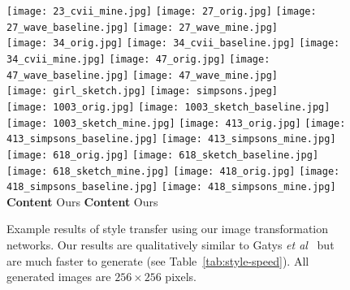 \documentclass[runningheads]{llncs}
\newcommand{\etal}{\textit{et al}}
\begin{document}
\begin{figure}
  \texttt{[image: 23\_cvii\_mine.jpg]}
  \texttt{[image: 27\_orig.jpg]}
  \texttt{[image: 27\_wave\_baseline.jpg]}
  \texttt{[image: 27\_wave\_mine.jpg]} \\
  \texttt{[image: 34\_orig.jpg]}
  \texttt{[image: 34\_cvii\_baseline.jpg]}
  \texttt{[image: 34\_cvii\_mine.jpg]}
  \texttt{[image: 47\_orig.jpg]}
  \texttt{[image: 47\_wave\_baseline.jpg]}
  \texttt{[image: 47\_wave\_mine.jpg]} \\
  \hspace*{12mm}
  \texttt{[image: girl\_sketch.jpg]}
  \hspace{8mm}
  \texttt{[image: simpsons.jpeg]} \\
\texttt{[image: 1003\_orig.jpg]}
  \texttt{[image: 1003\_sketch\_baseline.jpg]}
  \texttt{[image: 1003\_sketch\_mine.jpg]}
  \texttt{[image: 413\_orig.jpg]}
  \texttt{[image: 413\_simpsons\_baseline.jpg]}
  \texttt{[image: 413\_simpsons\_mine.jpg]} \\
  \texttt{[image: 618\_orig.jpg]}
  \texttt{[image: 618\_sketch\_baseline.jpg]}
  \texttt{[image: 618\_sketch\_mine.jpg]} 
  \texttt{[image: 418\_orig.jpg]}
  \texttt{[image: 418\_simpsons\_baseline.jpg]}
  \texttt{[image: 418\_simpsons\_mine.jpg]} \\
  \hspace*{2.5mm} \textbf{Content}
  \hspace{9mm} \cite{gatys2015neural}
  \hspace{12mm} Ours
  \hspace{9.5mm} \textbf{Content}
  \hspace{9mm} \cite{gatys2015neural}
  \hspace{12mm} Ours \\
  \vspace{-5mm}
  \caption{Example results of style transfer using our image transformation networks.
    Our results are qualitatively similar to Gatys \etal~\cite{gatys2015neural}
    but are much faster to generate (see Table~\ref{tab:style-speed}).
    All generated images are $256\times256$ pixels.
  }
  \label{fig:style-results}
\end{figure}
\end{document}
